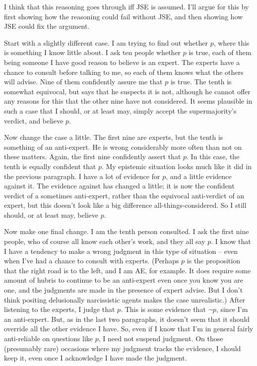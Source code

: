 \noindent I think that this reasoning goes through iff JSE is assumed. I'll argue for this by first showing how the reasoning could fail without JSE, and then showing how JSE could fix the argument.

Start with a slightly different case. I am trying to find out whether \(p\), where this is something I know little about. I ask ten people whether \(p\) is true, each of them being someone I have good reason to believe is an expert. The experts have a chance to consult before talking to me, so each of them knows what the others will advise. Nine of them confidently assure me that \(p\) is true. The tenth is somewhat equivocal, but says that he suspects it is not, although he cannot offer any reasons for this that the other nine have not considered. It seems plausible in such a case that I should, or at least may, simply accept the supermajority's verdict, and believe \(p\).

Now change the case a little. The first nine are experts, but the tenth is something of an anti-expert. He is wrong considerably more often than not on these matters. Again, the first nine confidently assert that \(p\). In this case, the tenth is equally confident that \(p\). My epistemic situation looks much like it did in the previous paragraph. I have a lot of evidence for \(p\), and a little evidence against it. The evidence against has changed a little; it is now the confident verdict of a sometimes anti-expert, rather than the equivocal anti-verdict of an expert, but this doesn't look like a big difference all-things-considered. So I still should, or at least may, believe \(p\).

Now make one final change. I am the tenth person consulted. I ask the first nine people, who of course all know each other's work, and they all say \(p\). I know that I have a tendency to make a wrong judgment in this type of situation -- even when I've had a chance to consult with experts. (Perhaps \(p\) is the proposition that the right road is to the left, and I am AE, for example. It does require some amount of hubris to continue to be an anti-expert even once you know you are one, and the judgments are made in the presence of expert advise. But I don't think positing delusionally narcissistic agents makes the case unrealistic.) After listening to the experts, I judge that \(p\). This is some evidence that \(\neg p\), since I'm an anti-expert. But, as in the last two paragraphs, it doesn't seem that it should override all the other evidence I have. So, even if I know that I'm in general fairly anti-reliable on questions like \(p\), I need not suspend judgment. On those (presumably rare) occasions where my judgment tracks the evidence, I should keep it, even once I acknowledge I have made the judgment.

